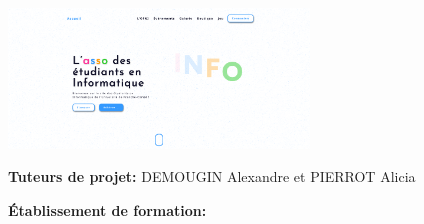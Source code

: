 \makeatletter
\begin{titlepage}
  \enlargethispage{3cm}


  \begin{center}	
    \vspace*{4cm}
    \textsc{\@title} \\
    \vspace*{0,5cm} 
    \HRule%
    \vspace*{0,5cm}
    \large{\@author} \\ 
    \vspace*{0.2cm}
    \anneeUniversitaire\\
    \vspace*{1cm}
    \includegraphics[width=8cm]{assets/pictures/home-page.png}
  \end{center}

  \vspace*{1cm}
  \noindent
  \large{\textbf{Tuteurs de projet:} \textsc{DEMOUGIN} Alexandre  et \textsc{PIERROT} Alicia}\\
  \vspace*{0.5cm}
  
  \noindent
  \large{\textbf{Établissement de formation:} \textsc{\univ}}\\

\end{titlepage}
\ClearShipoutPicture
\thispagestyle{empty}
\setcounter{page}{0}
\null
\newpage